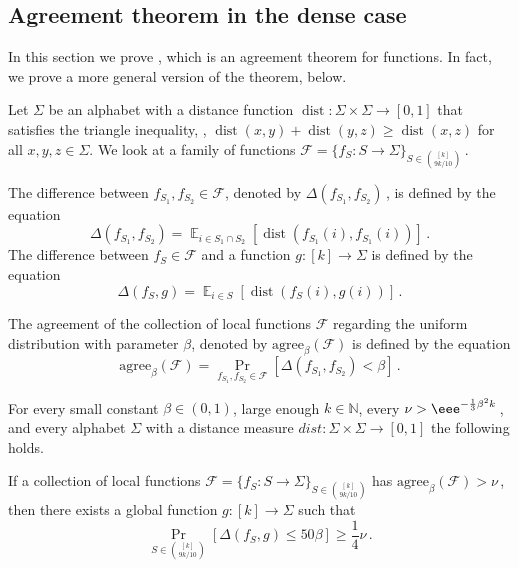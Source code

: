 \documentclass{toc}
\newcommand{\Prob}[2][]{\Pr_{{#1}}\left[#2\right]} %
\DeclareMathOperator*{\E}{\mathbb{E}} %
\newcommand{\set}[1]{\{#1\}} %
\newcommand\setf{f} %
\newcommand{\g}{g} %
\newcommand\pf{g} %
\DeclareMathOperator{\dist}{dist} %
\newcommand{\diff}{\Delta} %
\begin{document}
\subsection{Agreement theorem in the dense case}\label{sec:build}
In this section we prove , which is an agreement theorem for functions. 
In fact, we prove a more general version of the theorem,  below.

Let $\Sigma$ be an alphabet with a distance function $\dist:\Sigma\times\Sigma\rightarrow[0,1]$ that satisfies the triangle inequality, \ie, $\dist(x,y) + \dist(y,z) \ge \dist(x,z)$ for all $x,y,z\in \Sigma$.
%
We look at a family of functions $\mathcal{F} = \set{f_S:S\rightarrow\Sigma}_{S\in\binom{[k]}{9k/10}}$\,.
\begin{definition}
  The difference between $\setf_{S_1},\setf_{S_2}\in \mathcal{F}$, denoted by $\diff(\setf_{S_1},\setf_{S_2})$\,,  %
is defined by
the equation    %
	\[ \diff(\setf_{S_1},\setf_{S_2}) = \E_{i\in S_1\cap S_2}[\dist(\setf_{S_1}(i),\setf_{S_1}(i))]\,. \] %
The difference between $\setf_S\in\mathcal{F}$ 
%
and  %
a function $\pf:[k]\rightarrow\Sigma$ is %
defined by the equation  %
	\[ \diff(\setf_S,\g) = \E_{i\in S}[\dist(\setf_S(i),\pf(i))]\,. \]%
\end{definition}


\begin{definition}
  The agreement of the collection of local functions $\mathcal{F}$ regarding the uniform distribution with parameter $\beta$, denoted by $\text{agree}_\beta(\mathcal{F})$ is %
defined by the equation
	\[ \text{agree}_\beta(\mathcal{F}) = \Pr_{\setf_{S_1},\setf_{S_2}\in\mathcal{F}}[\diff(\setf_{S_1},\setf_{S_2}) < \beta] \,.\]%
\end{definition}

\begin{theorem}\label{thm:sets-general}
	For every small constant $\beta\in (0,1)$, large enough $k\in\mathbb{N}$, every $\nu > \eee^{-\frac{1}{3}\beta^2 k}$\,, and every alphabet $\Sigma$ with a distance measure $dist:\Sigma\times\Sigma\rightarrow [0,1]$ the following holds.
	
	If a collection of local functions $\mathcal{F} = \set{\setf_S:S\rightarrow \Sigma}_{S\in\binom{[k]}{9k/10}}$ has $\text{agree}_\beta(\mathcal{F})> \nu$\,, then there exists a global function $\pf:[k]\rightarrow\Sigma$ such that
	\[ \Prob[S\in\binom{[k]}{9k/10}]{{\diff(\setf_S,\g)} \leq 50\beta} \geq \frac{1}{4}\nu\,. \]%
\end{theorem} 	
\end{document}
